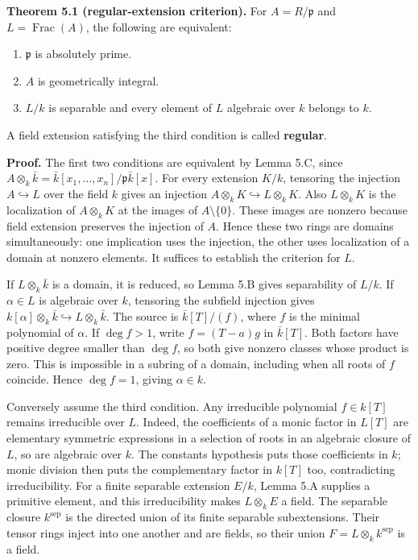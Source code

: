 \documentclass[
]{article}
\providecommand{\tightlist}{%
  \setlength{\itemsep}{0pt}\setlength{\parskip}{0pt}}
\begin{document}
\textbf{Theorem 5.1 (regular-extension criterion).} For
\(A=R/\mathfrak p\) and \(L=\operatorname{Frac}(A)\), the following are
equivalent:

\begin{enumerate}
\def\labelenumi{\arabic{enumi}.}
\tightlist
\item
  \(\mathfrak p\) is absolutely prime.
\item
  \(A\) is geometrically integral.
\item
  \(L/k\) is separable and every element of \(L\) algebraic over \(k\)
  belongs to \(k\).
\end{enumerate}

A field extension satisfying the third condition is called
\textbf{regular}.

\textbf{Proof.} The first two conditions are equivalent by Lemma 5.C,
since \(A\otimes_k\bar k=\bar k[x_1,\ldots,x_n]/\mathfrak p\bar k[x]\).
For every extension \(K/k\), tensoring the injection
\(A\hookrightarrow L\) over the field \(k\) gives an injection
\(A\otimes_k K\hookrightarrow L\otimes_k K\). Also \(L\otimes_k K\) is
the localization of \(A\otimes_k K\) at the images of
\(A\setminus\{0\}\). These images are nonzero because field extension
preserves the injection of \(A\). Hence these two rings are domains
simultaneously: one implication uses the injection, the other uses
localization of a domain at nonzero elements. It suffices to establish
the criterion for \(L\).

If \(L\otimes_k\bar k\) is a domain, it is reduced, so Lemma 5.B gives
separability of \(L/k\). If \(\alpha\in L\) is algebraic over \(k\),
tensoring the subfield injection gives
\(k[\alpha]\otimes_k\bar k\hookrightarrow L\otimes_k\bar k\). The source
is \(\bar k[T]/(f)\), where \(f\) is the minimal polynomial of
\(\alpha\). If \(\deg f>1\), write \(f=(T-a)g\) in \(\bar k[T]\). Both
factors have positive degree smaller than \(\deg f\), so both give
nonzero classes whose product is zero. This is impossible in a subring
of a domain, including when all roots of \(f\) coincide. Hence
\(\deg f=1\), giving \(\alpha\in k\).

Conversely assume the third condition. Any irreducible polynomial
\(f\in k[T]\) remains irreducible over \(L\). Indeed, the coefficients
of a monic factor in \(L[T]\) are elementary symmetric expressions in a
selection of roots in an algebraic closure of \(L\), so are algebraic
over \(k\). The constants hypothesis puts those coefficients in \(k\);
monic division then puts the complementary factor in \(k[T]\) too,
contradicting irreducibility. For a finite separable extension \(E/k\),
Lemma 5.A supplies a primitive element, and this irreducibility makes
\(L\otimes_k E\) a field. The separable closure \(k^{\mathrm{sep}}\) is
the directed union of its finite separable subextensions. Their tensor
rings inject into one another and are fields, so their union
\(F=L\otimes_k k^{\mathrm{sep}}\) is a field.
\end{document}
